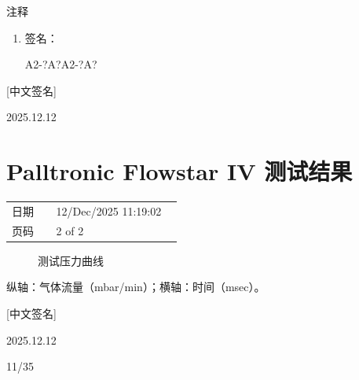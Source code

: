 \documentclass[UTF8,10pt,a4paper,fontset=fandol]{ctexart}
\newcommand{\fieldvalue}[1]{#1}
\newcommand{\handwritten}[1]{#1}
\begin{document}
\vspace{1em}

\noindent 注释

\begin{enumerate}
\item 签名：

\fieldvalue{\handwritten{A2-?A?A2-?A?}}
\end{enumerate}

\handwritten{[中文签名]}

\handwritten{2025.12.12}

\section{Palltronic Flowstar IV 测试结果}

\begin{tabular}{@{}p{0.24\linewidth}p{0.68\linewidth}@{}}
日期 &
\fieldvalue{12/Dec/2025 11:19:02}
\\
页码 &
\fieldvalue{2 of 2}
\\
\end{tabular}

\vspace{1em}

\begin{figure}[ht]
\centering
{}
\caption{测试压力曲线}
\end{figure}

\noindent
纵轴：气体流量（mbar/min）；横轴：时间（msec）。

\vspace{1em}

\handwritten{[中文签名]}

\handwritten{2025.12.12}

\handwritten{11/35}

\newpage
\end{document}
